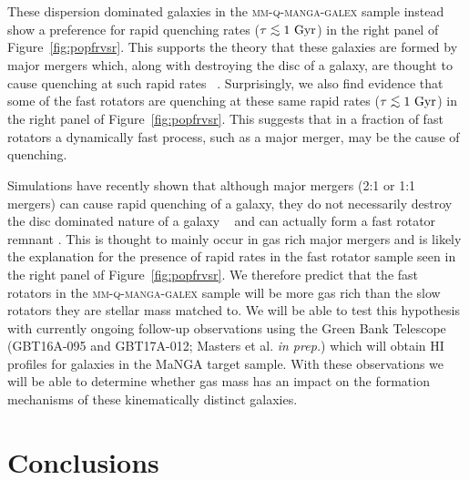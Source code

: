\documentclass[useAMS,usenatbib]{mn2e}
\def\lesssim{\mathrel{\hbox{\rlap{\hbox{\lower3pt\hbox{$\sim$}}}\hbox{\raise2pt\hbox{$<$}}}}}
\begin{document}
These dispersion dominated galaxies in the \textsc{mm-q-manga-galex} sample instead show a preference for rapid quenching rates ($\tau\lesssim1~\rm{Gyr}$) in the right panel of Figure~\ref{fig:popfrvsr}. This supports the theory that these galaxies are formed by major mergers which, along with destroying the disc of a galaxy, are thought to cause quenching at such rapid rates ~\citep{springel05b, bell06, lotz08b,lotz11,smethurst15}. Surprisingly, we also find evidence that some of the fast rotators are quenching at these same rapid rates ($\tau \lesssim 1~\rm{Gyr}$) in the right panel of Figure~\ref{fig:popfrvsr}. This suggests that in a fraction of fast rotators a dynamically fast process, such as a major merger, may be the cause of quenching. 

Simulations have recently shown that although major mergers (2:1 or 1:1 mergers) can cause rapid quenching of a galaxy, they do not necessarily destroy the disc dominated nature of a galaxy ~\citep{pontzen16, sparre16} and can actually form a fast rotator remnant \citep{bois11}. This is thought to mainly occur in gas rich major mergers \citep{bois11} and is likely the explanation for the presence of rapid rates in the fast rotator sample seen in the right panel of Figure~\ref{fig:popfrvsr}. We therefore predict that the fast rotators in the \textsc{mm-q-manga-galex} sample will be more gas rich than the slow rotators they are stellar mass matched to. We will be able to test this hypothesis with currently ongoing follow-up observations using the Green Bank Telescope (GBT16A-095 and GBT17A-012; Masters et al. \emph{in prep.}) which will obtain HI profiles for galaxies in the MaNGA target sample. With these observations we will be able to determine whether gas mass has an impact on the formation mechanisms of these kinematically distinct galaxies. 


\section{Conclusions}
\end{document}
